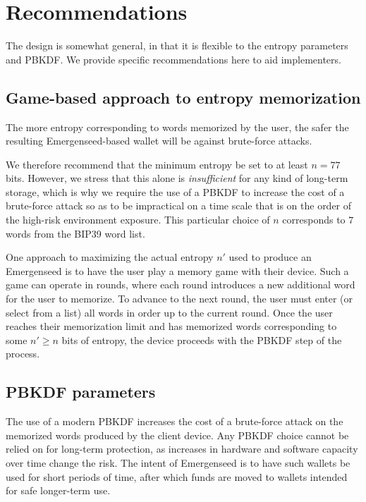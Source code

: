 \documentclass{article}
\begin{document}
\section{Recommendations}

The design is somewhat general, in that it is flexible to the entropy parameters and PBKDF.
We provide specific recommendations here to aid implementers.


\subsection{Game-based approach to entropy memorization}

The more entropy corresponding to words memorized by the user, the safer the resulting Emergenseed-based wallet will be against brute-force attacks.

We therefore recommend that the minimum entropy be set to at least $n = 77$ bits.
However, we stress that this alone is \textit{insufficient} for any kind of long-term storage, which is why we require the use of a PBKDF to increase the cost of a brute-force attack so as to be impractical on a time scale that is on the order of the high-risk environment exposure.
This particular choice of $n$ corresponds to $7$ words from the BIP39 word list.

One approach to maximizing the actual entropy $n'$ used to produce an Emergenseed is to have the user play a memory game with their device.
Such a game can operate in rounds, where each round introduces a new additional word for the user to memorize.
To advance to the next round, the user must enter (or select from a list) all words in order up to the current round.
Once the user reaches their memorization limit and has memorized words corresponding to some $n' \geq n$ bits of entropy, the device proceeds with the PBKDF step of the process.


\subsection{PBKDF parameters}

The use of a modern PBKDF increases the cost of a brute-force attack on the memorized words produced by the client device.
Any PBKDF choice cannot be relied on for long-term protection, as increases in hardware and software capacity over time change the risk.
The intent of Emergenseed is to have such wallets be used for short periods of time, after which funds are moved to wallets intended for safe longer-term use.
\end{document}
